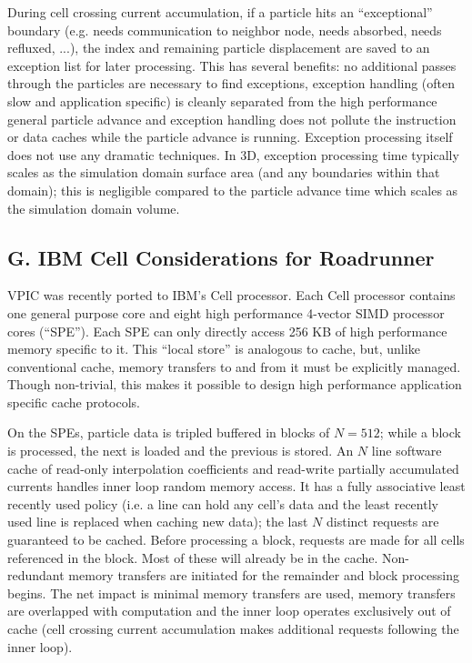 \documentclass[aps,prl,preprint,preprintnumbers,groupedaddress]{revtex4}
\begin{document}
During cell crossing current accumulation, if a particle hits an
``exceptional'' boundary (e.g. needs communication to neighbor node,
needs absorbed, needs refluxed, ...), the index and remaining particle
displacement are saved to an exception list for later processing.
This has several benefits: no additional passes through the particles
are necessary to find exceptions, exception handling (often slow and
application specific) is cleanly separated from the high performance
general particle advance and exception handling does not pollute the
instruction or data caches while the particle advance is running.
Exception processing itself does not use any dramatic techniques.  In
3D, exception processing time typically scales as the simulation
domain surface area (and any boundaries within that domain); this is
negligible compared to the particle advance time which scales as the
simulation domain volume.

\subsection{G. IBM Cell Considerations for Roadrunner}

VPIC was recently ported to IBM's Cell processor.  Each Cell processor
contains one general purpose core and eight high performance 4-vector
SIMD processor cores (``SPE'').  Each SPE can only directly access 256
KB of high performance memory specific to it.  This ``local store'' is
analogous to cache, but, unlike conventional cache, memory transfers
to and from it must be explicitly managed.  Though non-trivial, this
makes it possible to design high performance application specific
cache protocols. \cite{Kahle_et_al_2005}

On the SPEs, particle data is tripled buffered in blocks of $N=512$;
while a block is processed, the next is loaded and the previous is
stored.  An $N$ line software cache of read-only interpolation
coefficients and read-write partially accumulated currents handles
inner loop random memory access.  It has a fully associative least
recently used policy (i.e. a line can hold any cell's data and the
least recently used line is replaced when caching new data); the last
$N$ distinct requests are guaranteed to be cached.  Before processing
a block, requests are made for all cells referenced in the block.
Most of these will already be in the cache.  Non-redundant memory
transfers are initiated for the remainder and block processing begins.
The net impact is minimal memory transfers are used, memory transfers
are overlapped with computation and the inner loop operates
exclusively out of cache (cell crossing current accumulation makes
additional requests following the inner loop).
\end{document}
